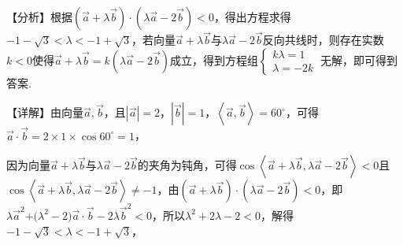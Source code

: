 



\bindp 【分析】根据\(\left( \overrightarrow{a} + \lambda\overrightarrow{b} \right) \cdot \allowbreak\left( \lambda\overrightarrow{a} - 2\overrightarrow{b} \right) < 0\)，得出方程求得\(- 1 - \sqrt{3} < \lambda < - 1 + \sqrt{3}\)，若向量\(\overrightarrow{a} + \lambda\overrightarrow{b}\)与\(\lambda\overrightarrow{a} - 2\overrightarrow{b}\)反向共线时，则存在实数\(k < 0\)使得\(\overrightarrow{a} + \lambda\overrightarrow{b} = k(\lambda\overrightarrow{a} - 2\overrightarrow{b})\)成立，得到方程组\(\left\{ \begin{array}{r}
k\lambda = 1 \\
\lambda = - 2k
\end{array} \right.\ \)无解，即可得到答案.

\bindp 【详解】由向量\(\overrightarrow{a},\overrightarrow{b}\)，且\(\left| \overrightarrow{a} \right| = 2\)，\(\left| \overrightarrow{b} \right| = 1\)，\(\left\langle \overrightarrow{a},\overrightarrow{b} \right\rangle = 60^{\circ}\)，可得\(\overrightarrow{a} \cdot \overrightarrow{b} = 2 \times 1 \times \cos 60^{\circ} = 1\)，

\bindp 因为向量\(\overrightarrow{a} + \lambda\overrightarrow{b}\)与\(\lambda\overrightarrow{a} - 2\overrightarrow{b}\)的夹角为钝角，可得\(\cos\left\langle \overrightarrow{a} + \lambda\overrightarrow{b},\lambda\overrightarrow{a} - 2\overrightarrow{b} \right\rangle < 0\)且\(\cos\left\langle \overrightarrow{a} + \lambda\overrightarrow{b},\lambda\overrightarrow{a} - 2\overrightarrow{b} \right\rangle \neq - 1\)，由\(\left( \overrightarrow{a} + \lambda\overrightarrow{b} \right) \cdot \allowbreak\left( \lambda\overrightarrow{a} - 2\overrightarrow{b} \right) < 0\)，即\(\lambda{\overrightarrow{a}}^{2}\text{+(}\lambda^{2} - 2)\overrightarrow{a} \cdot \overrightarrow{b} - 2\lambda{\overrightarrow{b}}^{2} < 0\)，所以\(\lambda^{2} + 2\lambda - 2 < 0\)，解得\(- 1 - \sqrt{3} < \lambda < - 1 + \sqrt{3}\)，

